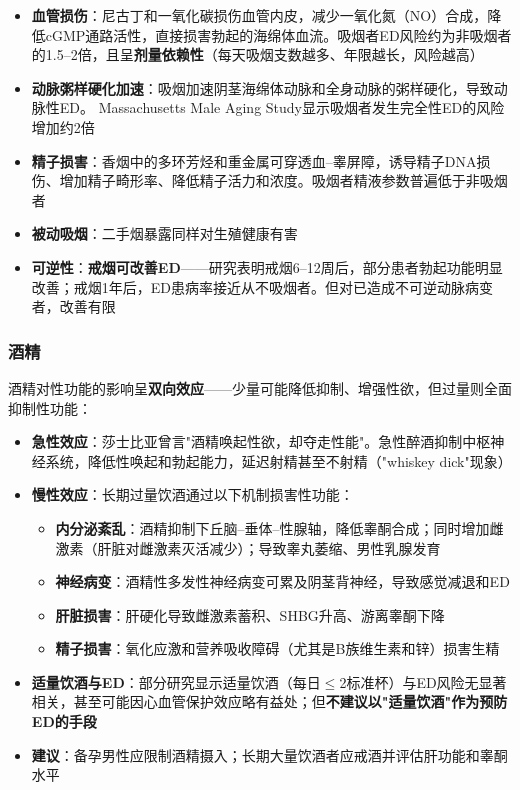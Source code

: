 \begin{itemize}[leftmargin=2cm]
	\item \textbf{血管损伤}：尼古丁和一氧化碳损伤血管内皮，减少一氧化氮（NO）合成，降低cGMP通路活性，直接损害勃起的海绵体血流。吸烟者ED风险约为非吸烟者的1.5--2倍，且呈\textbf{剂量依赖性}（每天吸烟支数越多、年限越长，风险越高）
	\item \textbf{动脉粥样硬化加速}：吸烟加速阴茎海绵体动脉和全身动脉的粥样硬化，导致动脉性ED。 Massachusetts Male Aging Study显示吸烟者发生完全性ED的风险增加约2倍
	\item \textbf{精子损害}：香烟中的多环芳烃和重金属可穿透血--睾屏障，诱导精子DNA损伤、增加精子畸形率、降低精子活力和浓度。吸烟者精液参数普遍低于非吸烟者
	\item \textbf{被动吸烟}：二手烟暴露同样对生殖健康有害
	\item \textbf{可逆性}：\textbf{戒烟可改善ED}——研究表明戒烟6--12周后，部分患者勃起功能明显改善；戒烟1年后，ED患病率接近从不吸烟者。但对已造成不可逆动脉病变者，改善有限
\end{itemize}

\subsubsection{酒精}

酒精对性功能的影响呈\textbf{双向效应}——少量可能降低抑制、增强性欲，但过量则全面抑制性功能：

\begin{itemize}[leftmargin=2cm]
	\item \textbf{急性效应}：莎士比亚曾言"酒精唤起性欲，却夺走性能"。急性醉酒抑制中枢神经系统，降低性唤起和勃起能力，延迟射精甚至不射精（"whiskey dick"现象）
	\item \textbf{慢性效应}：长期过量饮酒通过以下机制损害性功能：
    \begin{itemize}
    	\item \textbf{内分泌紊乱}：酒精抑制下丘脑--垂体--性腺轴，降低睾酮合成；同时增加雌激素（肝脏对雌激素灭活减少）；导致睾丸萎缩、男性乳腺发育
    	\item \textbf{神经病变}：酒精性多发性神经病变可累及阴茎背神经，导致感觉减退和ED
    	\item \textbf{肝脏损害}：肝硬化导致雌激素蓄积、SHBG升高、游离睾酮下降
    	\item \textbf{精子损害}：氧化应激和营养吸收障碍（尤其是B族维生素和锌）损害生精
    \end{itemize}
	\item \textbf{适量饮酒与ED}：部分研究显示适量饮酒（每日$\le$2标准杯）与ED风险无显著相关，甚至可能因心血管保护效应略有益处；但\textbf{不建议以"适量饮酒"作为预防ED的手段}
	\item \textbf{建议}：备孕男性应限制酒精摄入；长期大量饮酒者应戒酒并评估肝功能和睾酮水平
\end{itemize}

